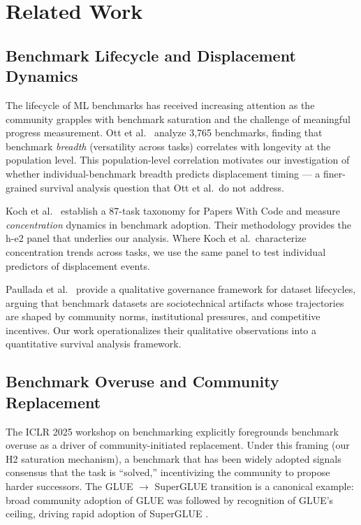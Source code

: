 \section{Related Work}

\subsection{Benchmark Lifecycle and Displacement Dynamics}

The lifecycle of ML benchmarks has received increasing attention as the community grapples with benchmark saturation and the challenge of meaningful progress measurement. Ott et al.\ \cite{ott2022benchmark} analyze 3,765 benchmarks, finding that benchmark \emph{breadth} (versatility across tasks) correlates with longevity at the population level. This population-level correlation motivates our investigation of whether individual-benchmark breadth predicts displacement timing --- a finer-grained survival analysis question that Ott et al.\ do not address.

Koch et al.\ \cite{koch2021reduced} establish a 87-task taxonomy for Papers With Code and measure \emph{concentration} dynamics in benchmark adoption. Their methodology provides the h-e2 panel that underlies our analysis. Where Koch et al.\ characterize concentration trends across tasks, we use the same panel to test individual predictors of displacement events.

Paullada et al.\ \cite{paullada2021data} provide a qualitative governance framework for dataset lifecycles, arguing that benchmark datasets are sociotechnical artifacts whose trajectories are shaped by community norms, institutional pressures, and competitive incentives. Our work operationalizes their qualitative observations into a quantitative survival analysis framework.

\subsection{Benchmark Overuse and Community Replacement}

The ICLR 2025 workshop on benchmarking \cite{iclr2025benchmarking} explicitly foregrounds benchmark overuse as a driver of community-initiated replacement. Under this framing (our H2 saturation mechanism), a benchmark that has been widely adopted signals consensus that the task is ``solved,'' incentivizing the community to propose harder successors. The GLUE $\to$ SuperGLUE transition is a canonical example: broad community adoption of GLUE \cite{wang2018glue} was followed by recognition of GLUE's ceiling, driving rapid adoption of SuperGLUE \cite{wang2019superglue}.

